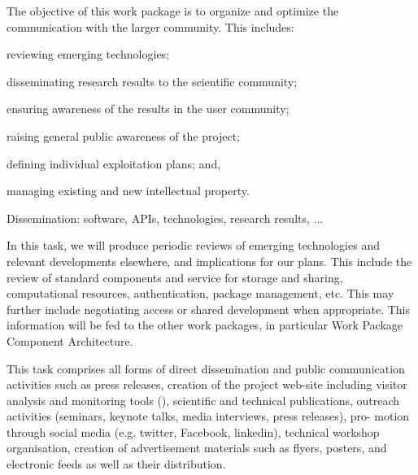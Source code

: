 \begin{workpackage}[id=dissem,wphases=18-48!.5,
  title=Dissemination,
  SARM=9,
  USORM=11,
  USHRM=8,
  USRM=24,
  UVRM=2
]


\begin{wpobjectives}
  The objective of this work package is to organize and optimize the
  communication with the larger community. This includes:
  \begin{compactitem}
  \item reviewing emerging technologies;
  \item disseminating research results to the scientific community;
  \item ensuring awareness of the results in the user community;
  \item raising general public awareness of the \TheProject project;
  \item defining individual exploitation plans; and,
  \item managing existing and new intellectual property.
  \end{compactitem}
\end{wpobjectives}

\begin{wpdescription}
  Dissemination: software, APIs, technologies, research results, ...
\end{wpdescription}

\begin{tasklist}
\begin{task}[title=Reviewing emerging technologies]
  In this task, we will produce periodic reviews of emerging
  technologies and relevant developments elsewhere, and implications
  for our plans. This include the review of standard components and
  service for storage and sharing, computational resources,
  authentication, package management, etc. This may further include
  negotiating access or shared development when appropriate. This
  information will be fed to the other work packages, in particular
  Work Package~ Component Architecture.
\end{task}

\begin{task}[title=Dissemination and Communication activities]


  This task comprises all forms of direct dissemination and public
  communication activities such as press releases, creation of the
  project web-site including visitor analysis and monitoring tools
  (), scientific and technical publications, outreach
  activities (seminars, keynote talks, media interviews, press
  releases), pro- motion through social media (e.g. twitter, Facebook,
  linkedin), technical workshop organisation, creation of
  advertisement materials such as flyers, posters, and electronic
  feeds as well as their distribution.


\end{task}
\end{tasklist}
\end{workpackage}
